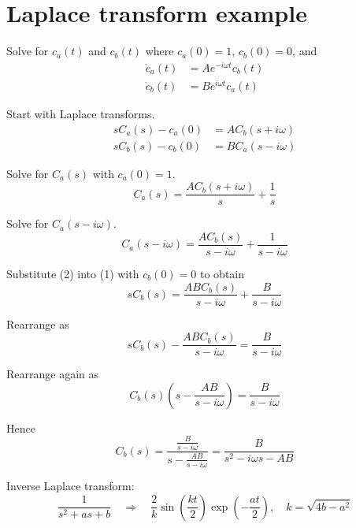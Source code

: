 

\section*{Laplace transform example}

Solve for $c_a(t)$ and $c_b(t)$ where $c_a(0)=1$, $c_b(0)=0$, and
\begin{align*}
\dot c_a(t)&=Ae^{-i\omega t}c_b(t)
\\
\dot c_b(t)&=Be^{i\omega t}c_a(t)
\end{align*}

Start with Laplace transforms.
\begin{align*}
sC_a(s)-c_a(0)&=AC_b(s+i\omega)
\\
sC_b(s)-c_b(0)&=BC_a(s-i\omega)
\tag{1}
\end{align*}

Solve for $C_a(s)$ with $c_a(0)=1$.
\begin{equation*}
C_a(s)=\frac{AC_b(s+i\omega)}{s}+\frac{1}{s}
\end{equation*}

Solve for $C_a(s-i\omega)$.
\begin{equation*}
C_a(s-i\omega)=\frac{AC_b(s)}{s-i\omega}+\frac{1}{s-i\omega}
\tag{2}
\end{equation*}

Substitute (2) into (1) with $c_b(0)=0$ to obtain
\begin{equation*}
sC_b(s)=\frac{ABC_b(s)}{s-i\omega}+\frac{B}{s-i\omega}
\end{equation*}

Rearrange as
\begin{equation*}
sC_b(s)-\frac{ABC_b(s)}{s-i\omega}=\frac{B}{s-i\omega}
\end{equation*}

Rearrange again as
\begin{equation*}
C_b(s)\left(s-\frac{AB}{s-i\omega}\right)=\frac{B}{s-i\omega}
\end{equation*}

Hence
\begin{equation*}
C_b(s)=\frac
{\displaystyle\frac{B}{s-i\omega}}
{\displaystyle s-\frac{AB}{s-i\omega}}
=\frac{B}{s^2-i\omega s-AB}
\end{equation*}

Inverse Laplace transform:
\begin{equation*}
\frac{1}{s^2+as+b}\quad\Rightarrow\quad
\frac{2}{k}\sin\left(\frac{kt}{2}\right)\exp\left(-\frac{at}{2}\right),\quad
k=\sqrt{4b-a^2}
\end{equation*}

